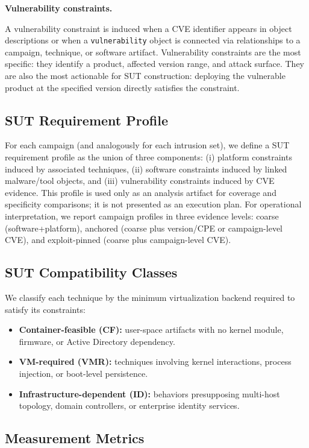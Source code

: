 \documentclass[sigconf,anonymous,review]{acmart}
\newcommand{\myparagraph}[1]{\textbf{#1.}\hspace{0.5em}}
\begin{document}
\myparagraph{Vulnerability constraints}

A vulnerability constraint is induced when a CVE identifier appears in object descriptions or when a \texttt{vulnerability} object is connected via relationships to a campaign, technique, or software artifact. Vulnerability constraints are the most specific: they identify a product, affected version range, and attack surface. They are also the most actionable for SUT construction: deploying the vulnerable product at the specified version directly satisfies the constraint.

\subsection{SUT Requirement Profile}

For each campaign (and analogously for each intrusion set), we define a SUT requirement profile as the union of three components: (i) platform constraints induced by associated techniques, (ii) software constraints induced by linked malware/tool objects, and (iii) vulnerability constraints induced by CVE evidence. This profile is used only as an analysis artifact for coverage and specificity comparisons; it is not presented as an execution plan. For operational interpretation, we report campaign profiles in three evidence levels: coarse (software+platform), anchored (coarse plus version/CPE or campaign-level CVE), and exploit-pinned (coarse plus campaign-level CVE).

\subsection{SUT Compatibility Classes}

We classify each technique by the minimum virtualization backend required to satisfy its constraints:

\begin{itemize}
\item \textbf{Container-feasible (CF):} user-space artifacts with no kernel module, firmware, or Active Directory dependency.
\item \textbf{VM-required (VMR):} techniques involving kernel interactions, process injection, or boot-level persistence.
\item \textbf{Infrastructure-dependent (ID):} behaviors presupposing multi-host topology, domain controllers, or enterprise identity services.
\end{itemize}

\subsection{Measurement Metrics}
\end{document}
